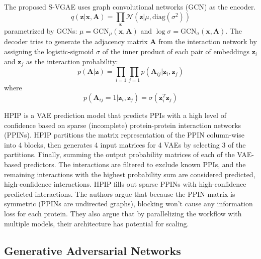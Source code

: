 \documentclass{article}
\begin{document}
The proposed S-VGAE uses graph convolutional networks (GCN) as the encoder. 
\[q(\mathbf{z}|\mathbf{x},\mathbf{A}) = \prod_\mathbf{z}\mathcal{N}(\mathbf{z}|\mu, \text{diag}(\sigma^2))\]
parametrized by GCNs: $\mu=\text{GCN}_{\mu}(\mathbf{x},\mathbf{A})$ and $\log\sigma = \text{GCN}_{\sigma}(\mathbf{x},\mathbf{A})$. The decoder tries to generate the adjacency matrix \(\mathbf{A}\) from the interaction network by assigning the logistic-sigmoid \(\sigma\) of the inner product of each pair of embeddings $\mathbf{z}_i$ and $\mathbf{z}_j$ as the interaction probability:
\[p(\mathbf{A}|\mathbf{z}) = \prod_{i=1}\prod_{j=1}p(\mathbf{A}_{ij}|\mathbf{z}_i, \mathbf{z}_j)\]
where
\[p(\mathbf{A}_{ij} = 1 | \mathbf{z}_i,\mathbf{z}_j) = \sigma(\mathbf{z}_i^T\mathbf{z}_j)\]

HPIP \citep{xiao_highly-confident_2021} is a VAE prediction model that predicts PPIs with a high level of confidence based on sparse (incomplete) protein-protein interaction networks (PPINs). HPIP partitions the matrix representation of the PPIN column-wise into 4 blocks, then generates 4 input matrices for 4 VAEs by selecting 3 of the partitions. Finally, summing the output probability matrices of each of the VAE-based predictors. The interactions are filtered to exclude known PPIs, and the remaining interactions with the highest probability sum are considered predicted, high-confidence interactions. HPIP fills out sparse PPINs with high-confidence predicted interactions. The authors argue that because the PPIN matrix is symmetric (PPINs are undirected graphs), blocking won't cause any information loss for each protein. They also argue that by parallelizing the workflow with multiple models, their architecture has potential for scaling. 



\subsection{Generative Adversarial Networks}
\end{document}
